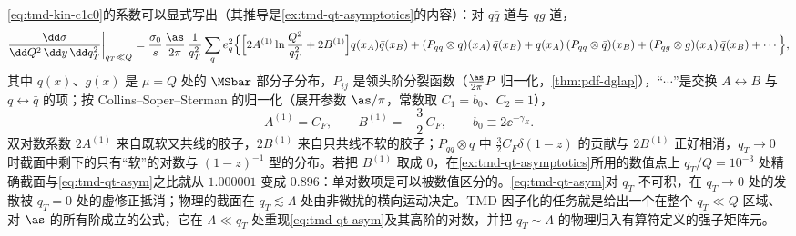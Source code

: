 \cref{eq:tmd-kin-c1c0}的系数可以显式写出（其推导是\cref{ex:tmd-qt-asymptotics}的内容）：对 $q\bar q$ 道与 $qg$ 道，
\begin{equation}\label{eq:tmd-qt-asym}
\frac{\dd\sigma}{\dd Q^2\,\dd y\,\dd q_T^2}\bigg|_{q_T\ll Q}=\frac{\sigma_0}{s}\,\frac{\as}{2\pi}\,\frac{1}{q_T^2}\sum_qe_q^2\Big\{\Big[2A^{(1)}\ln\frac{Q^2}{q_T^2}+2B^{(1)}\Big]q(x_A)\bar q(x_B)+(P_{qq}\otimes q)(x_A)\,\bar q(x_B)+q(x_A)\,(P_{qq}\otimes\bar q)(x_B)+(P_{qg}\otimes g)(x_A)\,\bar q(x_B)+\cdots\Big\},
\end{equation}
其中 $q(x)$、$g(x)$ 是 $\mu=Q$ 处的 $\MSbar$ 部分子分布，$P_{ij}$ 是领头阶分裂函数（$\frac{\as}{2\pi}P$ 归一化，\cref{thm:pdf-dglap}），“$\cdots$”是交换 $A\leftrightarrow B$ 与 $q\leftrightarrow\bar q$ 的项；按 Collins--Soper--Sterman 的归一化（展开参数 $\as/\pi$，常数取 $C_1=b_0$、$C_2=1$），
\begin{equation}\label{eq:tmd-A1B1}
A^{(1)}=C_F,\qquad B^{(1)}=-\frac32\,C_F,\qquad b_0\equiv2\ee^{-\gamma_E}.
\end{equation}
双对数系数 $2A^{(1)}$ 来自既软又共线的胶子，$2B^{(1)}$ 来自只共线不软的胶子；$P_{qq}\otimes q$ 中 $\frac32C_F\delta(1-z)$ 的贡献与 $2B^{(1)}$ 正好相消，$q_T\to0$ 时截面中剩下的只有“软”的对数与 $(1-z)^{-1}$ 型的分布。若把 $B^{(1)}$ 取成 $0$，在\cref{ex:tmd-qt-asymptotics}所用的数值点上 $q_T/Q=10^{-3}$ 处精确截面与\cref{eq:tmd-qt-asym}之比就从 $1.000001$ 变成 $0.896$：单对数项是可以被数值区分的。\cref{eq:tmd-qt-asym}对 $q_T$ 不可积，在 $q_T\to0$ 处的发散被 $q_T=0$ 处的虚修正抵消；物理的截面在 $q_T\lesssim\Lambda$ 处由非微扰的横向运动决定。TMD 因子化的任务就是给出一个在整个 $q_T\ll Q$ 区域、对 $\as$ 的所有阶成立的公式，它在 $\Lambda\ll q_T$ 处重现\cref{eq:tmd-qt-asym}及其高阶的对数，并把 $q_T\sim\Lambda$ 的物理归入有算符定义的强子矩阵元。
